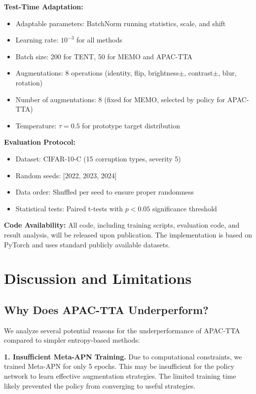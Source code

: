 \documentclass{article}
\begin{document}
\textbf{Test-Time Adaptation:}
\begin{itemize}
    \item Adaptable parameters: BatchNorm running statistics, scale, and shift
    \item Learning rate: $10^{-3}$ for all methods
    \item Batch size: 200 for TENT, 50 for MEMO and APAC-TTA
    \item Augmentations: 8 operations (identity, flip, brightness$\pm$, contrast$\pm$, blur, rotation)
    \item Number of augmentations: 8 (fixed for MEMO, selected by policy for APAC-TTA)
    \item Temperature: $\tau = 0.5$ for prototype target distribution
\end{itemize}

\textbf{Evaluation Protocol:}
\begin{itemize}
    \item Dataset: CIFAR-10-C (15 corruption types, severity 5)
    \item Random seeds: [2022, 2023, 2024]
    \item Data order: Shuffled per seed to ensure proper randomness
    \item Statistical tests: Paired t-tests with $p < 0.05$ significance threshold
\end{itemize}

\textbf{Code Availability:} All code, including training scripts, evaluation code, and result analysis, will be released upon publication. The implementation is based on PyTorch and uses standard publicly available datasets.

\section{Discussion and Limitations}

\subsection{Why Does APAC-TTA Underperform?}

We analyze several potential reasons for the underperformance of APAC-TTA compared to simpler entropy-based methods:

\textbf{1. Insufficient Meta-APN Training.} Due to computational constraints, we trained Meta-APN for only 5 epochs. This may be insufficient for the policy network to learn effective augmentation strategies. The limited training time likely prevented the policy from converging to useful strategies.
\end{document}
